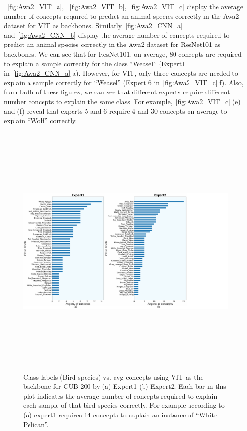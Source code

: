 ~\cref{fig:Awa2_VIT_a}, ~\cref{fig:Awa2_VIT_b},~\cref{fig:Awa2_VIT_c} display the average number of concepts required to predict an animal species correctly in the Awa2 dataset for VIT as backbones. Similarly~\cref{fig:Awa2_CNN_a} and~\cref{fig:Awa2_CNN_b} display the average number of concepts required to predict an animal species correctly in the Awa2 dataset for ResNet101 as backbones. We can see that for ResNet101, on average, 80 concepts are required to explain a sample correctly for the class ``Weasel'' (Expert1 in~\cref{fig:Awa2_CNN_a} a). However, for VIT, only three concepts are needed to explain a sample correctly for ``Weasel'' (Expert 6 in~\cref{fig:Awa2_VIT_c} f). Also, from both of these figures, we can see that different experts require different number concepts to explain the same class. For example,~\cref {fig:Awa2_VIT_c} (e) and (f) reveal that experts 5 and 6 require 4 and 30 concepts on average to explain ``Wolf'' correctly.

\begin{figure}
\centering
\includegraphics[width=14cm, height=13cm]
{figures/Supp/Avg_concept_class_VIT_cub_1.pdf}
\caption{Class labels (Bird species) vs. avg concepts using VIT as the backbone for CUB-200 by (a) Expert1 (b) Expert2. Each bar in this plot indicates the average number of concepts required to explain each sample of that bird species correctly. For example according to (a) expert1 requires 14 concepts to explain an instance of ``White Pelican''.}
\label{fig:vit_cub_concept_1_2}
\end{figure}

